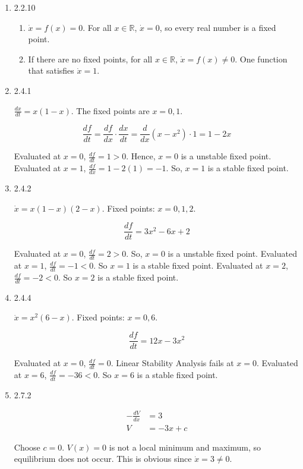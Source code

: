 \documentclass[12pt]{article}
\begin{document}

\begin{enumerate}[start=1,label={\bfseries Problem \arabic*:},leftmargin=1in] %
    \item 2.2.10 
    \begin{enumerate}
        \item $\dot{x} = f(x) = 0$. For all $x \in \mathbb{R}$, $\dot{x} = 0$, so every real number is a fixed point. 
        \item If there are no fixed points, for all $x \in \mathbb{R}$, $\dot{x} = f(x) \neq 0$. 
        One function that satisfies  $\dot{x} = 1$. 
    \end{enumerate}

    \item 2.4.1 
    
    $\frac{dx}{dt} = x(1-x)$. The fixed points are $x=0,1$.  

    \[
    \frac{df}{dt} = \frac{df}{dx} \cdot \frac{dx}{dt} = \frac{d}{dx}(x - x^{2}) \cdot 1 = 1 - 2x
    \]
    
    Evaluated at $x=0$, $\frac{df}{dt} = 1 > 0$. Hence, $x = 0$ is a unstable fixed point. 
    Evaluated at $x=1$, $\frac{df}{dx} = 1 - 2(1) = -1$. So, $x=1$ is a stable fixed point. 


    \item 2.4.2 
    
    $\dot{x} = x(1-x)(2-x)$. Fixed points: $x = 0, 1, 2$.  

    \[
    \frac{df}{dt} = 3x^{2} - 6x + 2
    \]

    Evaluated at $x=0$, $\frac{df}{dt} = 2 > 0$. So, $x=0$ is a unstable fixed point. 
    Evaluated at $x=1$, $\frac{df}{dt} = -1 < 0$. So $x=1$ is a stable fixed point. 
    Evaluated at $x=2$, $\frac{df}{dt} = -2 < 0$. So $x=2$ is a stable fixed point. 

    \item 2.4.4 
    
    $\dot{x} = x^{2}(6 - x)$. Fixed points: $x = 0, 6$. 

    \[
    \frac{df}{dt} = 12x - 3x^{2} 
    \]

    Evaluated at $x=0$, $\frac{df}{dt} = 0$. Linear Stability Analysis fails at $x=0$. 
    Evaluated at $x=6$, $\frac{df}{dt} = -36 < 0$. So $x=6$ is a stable fixed point. 

    \item 2.7.2 
    
    \begin{align*}
        -\frac{dV}{dx} &= 3 \\ 
        V &= -3x + c
    \end{align*}

    Choose $c = 0$. $V(x) = 0$ is not a local minimum and maximum, so equilibrium does not occur.
    This is obvious since $\dot{x} = 3 \neq 0$. 
\end{enumerate}
\end{document}
